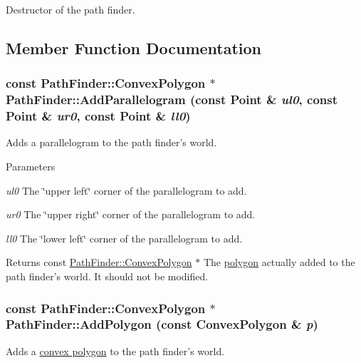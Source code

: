 Destructor of the path finder. 



\subsection{Member Function Documentation}
\hypertarget{classPathFinder_a85d6d0654ad55f798c4ecc826f7f63de}{
\subsubsection[{AddParallelogram}]{\setlength{\rightskip}{0pt plus 5cm}const {\bf PathFinder::ConvexPolygon} $\ast$ PathFinder::AddParallelogram (const {\bf Point} \& {\em ul0}, \/  const {\bf Point} \& {\em ur0}, \/  const {\bf Point} \& {\em ll0})}}
\label{classPathFinder_a85d6d0654ad55f798c4ecc826f7f63de}


Adds a parallelogram to the path finder's world. 


\begin{DoxyParams}{Parameters}
\item[{\em ul0}]The \char`\"{}upper left\char`\"{} corner of the parallelogram to add. \item[{\em ur0}]The \char`\"{}upper right\char`\"{} corner of the parallelogram to add. \item[{\em ll0}]The \char`\"{}lower left\char`\"{} corner of the parallelogram to add. \end{DoxyParams}
\begin{DoxyReturn}{Returns}
const \hyperlink{structPathFinder_1_1ConvexPolygon}{PathFinder::ConvexPolygon} $\ast$ The \hyperlink{structPathFinder_1_1ConvexPolygon}{polygon} actually added to the path finder's world. It should not be modified. 
\end{DoxyReturn}
\hypertarget{classPathFinder_ae167f12c8466a501a5a54068f92328c7}{
\subsubsection[{AddPolygon}]{\setlength{\rightskip}{0pt plus 5cm}const {\bf PathFinder::ConvexPolygon} $\ast$ PathFinder::AddPolygon (const {\bf ConvexPolygon} \& {\em p})}}
\label{classPathFinder_ae167f12c8466a501a5a54068f92328c7}


Adds a \hyperlink{structPathFinder_1_1ConvexPolygon}{convex polygon} to the path finder's world. 


